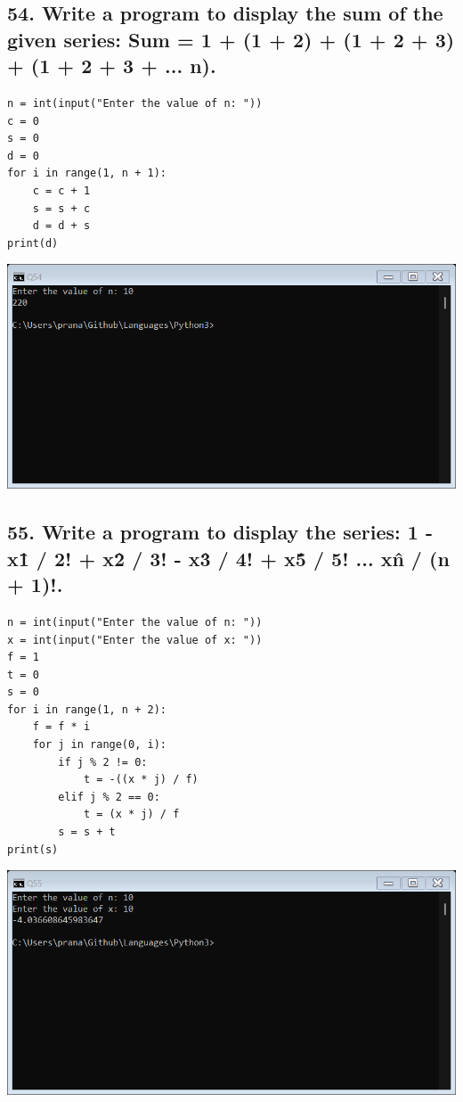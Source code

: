 \documentclass[12pt]{article}
\begin{document}
\subsection*{54. Write a program to display the sum of the given series: Sum = 1 + (1 + 2) + (1 + 2 + 3) + (1 + 2 + 3 + ... n).}
\begin{verbatim}
n = int(input("Enter the value of n: "))
c = 0
s = 0
d = 0
for i in range(1, n + 1):
    c = c + 1
    s = s + c
    d = d + s
print(d)
\end{verbatim}
\includegraphics[width=\linewidth]{images/54.png}

\subsection*{55. Write a program to display the series: 1 - x\^1 / 2! + x\^2 / 3! - x\^3 / 4! + x\^5 / 5! ... x\^n / (n + 1)!.}
\begin{verbatim}
n = int(input("Enter the value of n: "))
x = int(input("Enter the value of x: "))
f = 1
t = 0
s = 0
for i in range(1, n + 2):
    f = f * i
    for j in range(0, i):
        if j % 2 != 0:
            t = -((x * j) / f)
        elif j % 2 == 0:
            t = (x * j) / f
        s = s + t
print(s)
\end{verbatim}
\includegraphics[width=\linewidth]{images/55.png}
\end{document}

